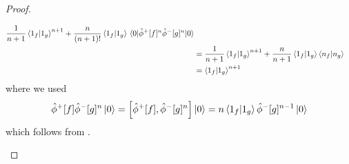 \begin{proof}
\begin{itemize}
\begin{equation*}
\begin{split}
				\frac{1}{n+1}
				\braket{1_f}{1_g}^{n+1}
				+
				\frac{n}{(n+1)!}
				\braket{1_f}{1_g}
				\expval{
					\hat\phi^+[f]^n
					\hat\phi^-[g]^n
				}{0}
				\\
				&=
				\frac{1}{n+1}
				\braket{1_f}{1_g}^{n+1}
				+
				\frac{n}{n+1}
				\braket{1_f}{1_g}
				\braket{n_f}{n_g}
				\\
				&=
				\braket{1_f}{1_g}^{n+1}
			\end{split}
		\end{equation*}
		where we used
		\begin{equation*}
			\hat\phi^+[f]
			\hat\phi^-[g]^n
			\ket{0}
			=
			\comm{\hat\phi^+[f]}{\hat\phi^-[g]^n}
			\ket{0}
			=
			n
			\braket{1_f}{1_g}
			\hat\phi^-[g]^{n-1}
			\ket{0}
		\end{equation*}
		which follows from .
	\end{itemize}
\end{proof}

